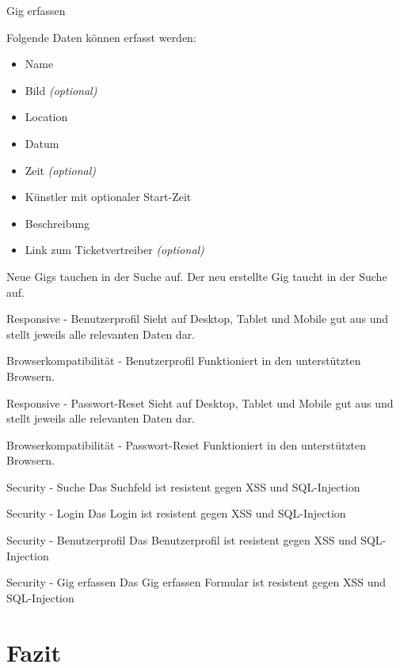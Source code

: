 \clearpage

\acceptancetest
  {Gig erfassen}
  {Folgende Daten können erfasst werden:
  \begin{itemize}
    \tightlist{}
    \item{} Name
    \item{} Bild \textit{(optional)}
    \item{} Location
    \item{} Datum
    \item{} Zeit \textit{(optional)}
    \item{} Künstler mit optionaler Start-Zeit
    \item{} Beschreibung
    \item{} Link zum Ticketvertreiber \textit{(optional)}
  \end{itemize}}

\acceptancetest
  {Neue Gigs tauchen in der Suche auf.}
  {Der neu erstellte Gig taucht in der Suche auf.}

\clearpage

\acceptancetest
  {Responsive - Benutzerprofil}
  {Sieht auf Desktop, Tablet und Mobile gut aus und stellt jeweils alle relevanten Daten dar.}

\acceptancetest
  {Browserkompatibilität - Benutzerprofil}
  {Funktioniert in den unterstützten Browsern.}

\clearpage

\acceptancetest
  {Responsive - Passwort-Reset}
  {Sieht auf Desktop, Tablet und Mobile gut aus und stellt jeweils alle relevanten Daten dar.}

\acceptancetest
  {Browserkompatibilität - Passwort-Reset}
  {Funktioniert in den unterstützten Browsern.}

\clearpage

\acceptancetest
  {Security - Suche}
  {Das Suchfeld ist resistent gegen XSS und SQL-Injection}

\acceptancetest
  {Security - Login}
  {Das Login ist resistent gegen XSS und SQL-Injection}

\clearpage

\acceptancetest
  {Security - Benutzerprofil}
  {Das Benutzerprofil ist resistent gegen XSS und SQL-Injection}

\acceptancetest
  {Security - Gig erfassen}
  {Das Gig erfassen Formular ist resistent gegen XSS und SQL-Injection}

\clearpage
\section{Fazit}\label{konzept-fazit}

